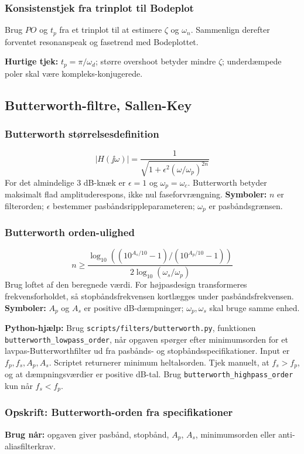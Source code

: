\subsubsection{Konsistenstjek fra trinplot til Bodeplot}
Brug \(PO\) og \(t_p\) fra et trinplot til at estimere \(\zeta\) og \(\omega_n\). Sammenlign derefter forventet resonanspeak og fasetrend med Bodeplottet.

\textbf{Hurtige tjek:} \(t_p=\pi/\omega_d\); større overshoot betyder mindre \(\zeta\); underdæmpede poler skal være kompleks-konjugerede.

\subsection{Butterworth-filtre, Sallen-Key}

\subsubsection{Butterworth størrelsesdefinition}
\[
|H(\jj\omega)|=\frac{1}{\sqrt{1+\epsilon^2(\omega/\omega_p)^{2n}}}
\]
For det almindelige \(3\) dB-knæk er \(\epsilon=1\) og \(\omega_p=\omega_c\). Butterworth betyder maksimalt flad amplituderespons, ikke nul faseforvrængning.
\textbf{Symboler:} \(n\) er filterorden; \(\epsilon\) bestemmer pasbåndsrippleparameteren; \(\omega_p\) er pasbåndsgrænsen.

\subsubsection{Butterworth orden-ulighed}
\[
n\ge
\frac{\log_{10}\left((10^{A_s/10}-1)/(10^{A_p/10}-1)\right)}
{2\log_{10}(\omega_s/\omega_p)}
\]
Brug loftet af den beregnede værdi. For højpasdesign transformeres frekvensforholdet, så stopbåndsfrekvensen kortlægges under pasbåndsfrekvensen.
\textbf{Symboler:} \(A_p\) og \(A_s\) er positive dB-dæmpninger; \(\omega_p,\omega_s\) skal bruge samme enhed.

\textbf{Python-hjælp:} Brug \texttt{scripts/filters/butterworth.py}, funktionen \texttt{butterworth\_lowpass\_order}, når opgaven spørger efter minimumsorden for et lavpas-Butterworthfilter ud fra pasbånds- og stopbåndsspecifikationer. Input er \(f_p,f_s,A_p,A_s\). Scriptet returnerer minimum heltalsorden. Tjek manuelt, at \(f_s>f_p\), og at dæmpningsværdier er positive dB-tal. Brug \texttt{butterworth\_highpass\_order} kun når \(f_s<f_p\).

\subsubsection{Opskrift: Butterworth-orden fra specifikationer}
\textbf{Brug når:} opgaven giver pasbånd, stopbånd, \(A_p\), \(A_s\), minimumsorden eller anti-aliasfilterkrav.

